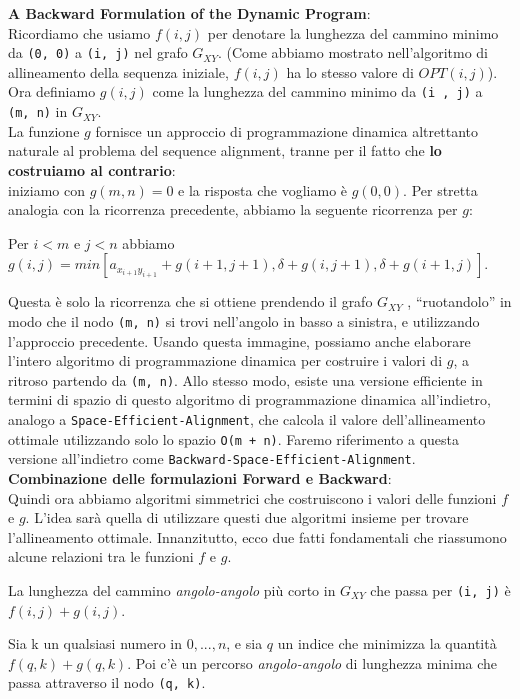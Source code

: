 \textbf{A Backward Formulation of the Dynamic Program}:\\ Ricordiamo che
usiamo $f(i, j)$ per denotare la lunghezza del cammino minimo da
\texttt{(0,\ 0)} a \texttt{(i,\ j)} nel grafo $G_{XY}$. (Come abbiamo
mostrato nell'algoritmo di allineamento della sequenza iniziale,
$f(i, j)$ ha lo stesso valore di $OPT(i, j)$).\\ Ora definiamo
$g(i, j)$ come la lunghezza del cammino minimo da \texttt{(i\ ,\ j)} a
\texttt{(m,\ n)} in $G_{XY}$.\\ La funzione $g$ fornisce un approccio
di programmazione dinamica altrettanto naturale al problema del sequence
alignment, tranne per il fatto che \textbf{lo costruiamo al contrario}:\\
iniziamo con $g(m, n) = 0$ e la risposta che vogliamo è $g(0, 0)$.
Per stretta analogia con la ricorrenza precedente, abbiamo la seguente
ricorrenza per $g$:
\begin{myblockquote} Per $i < m$ e $j < n$ abbiamo\\
	$g(i, j) = min[a_{x_{i+1} y_{i+1}} + g(i + 1, j + 1), \delta + g(i, j + 1), \delta + g (i + 1, j)]$.
\end{myblockquote}

Questa è solo la ricorrenza che si ottiene prendendo il grafo $G_{XY}$
, ``ruotandolo'' in modo che il nodo \texttt{(m,\ n)} si trovi
nell'angolo in basso a sinistra, e utilizzando l'approccio precedente.
Usando questa immagine, possiamo anche elaborare l'intero algoritmo di
programmazione dinamica per costruire i valori di $g$, a ritroso
partendo da \texttt{(m,\ n)}. Allo stesso modo, esiste una versione
efficiente in termini di spazio di questo algoritmo di programmazione
dinamica all'indietro, analogo a \texttt{Space-Efficient-Alignment}, che
calcola il valore dell'allineamento ottimale utilizzando solo lo spazio
\texttt{O(m\ +\ n)}. Faremo riferimento a questa versione all'indietro
come \texttt{Backward-Space-Efficient-Alignment}.\\

\textbf{Combinazione delle formulazioni Forward e Backward}:\\ Quindi ora
abbiamo algoritmi simmetrici che costruiscono i valori delle funzioni
$f$ e $g$. L'idea sarà quella di utilizzare questi due algoritmi
insieme per trovare l'allineamento ottimale. Innanzitutto, ecco due
fatti fondamentali che riassumono alcune relazioni tra le funzioni $f$
e $g$.
\begin{myblockquote}
	La lunghezza del cammino \emph{angolo-angolo}
	più corto in $G_{XY}$ che passa per \texttt{(i, j)} è
	$f(i, j) + g(i, j)$.
\end{myblockquote}
\begin{myblockquote}
	Sia k un qualsiasi numero in ${0, . . . , n}$, e sia $q$ un indice
	che minimizza la quantità $f(q, k) + g(q, k)$. Poi c'è un percorso
	\emph{angolo-angolo} di lunghezza minima che passa attraverso il nodo \texttt{(q, k)}.
\end{myblockquote}

